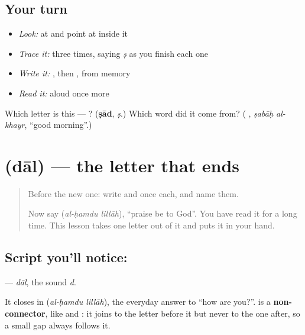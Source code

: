 \subsection*{Your turn}
\begin{itemize}
\raggedright
  \item \emph{Look:} at \textbf{ } and point at  inside it
  \item \emph{Trace it:}  three times, saying \emph{ṣ} as you finish each one
  \item \emph{Write it:} , then , from memory
  \item \emph{Read it:} \textbf{ } aloud once more
\end{itemize}

\begin{tcolorbox}[breakable,colback=teal!4,colframe=teal!35!black,title={Before you move on}]
Which letter is this — ? (\textbf{ṣād}, \emph{ṣ}.) Which word did it come from? (\textbf{ }, \emph{ṣabāḥ al-khayr}, \textquotedblleft{}good morning\textquotedblright{}.)
\end{tcolorbox}
\section[\texorpdfstring{\ar{د} (dāl)}{د (dāl)}]{ (dāl) — the letter that ends }

\label{lesson:AR-W46-dal}



\begin{quote}
Before the new one: write  and  once each, and name them.

Now say \textbf{ } (\emph{al-ḥamdu lillāh}), \textquotedblleft{}praise be to God\textquotedblright{}. You have read it for a long time. This lesson takes one letter out of it and puts it in your hand.
\end{quote}

\subsection*{Script you'll notice: }
\textbf{} — \emph{dāl}, the sound \emph{d}.

It closes \textbf{} in \textbf{ } (\emph{al-ḥamdu lillāh}), the everyday answer to \textquotedblleft{}how are you?\textquotedblright{}. \textbf{} is a \textbf{non-connector}, like \textbf{} and \textbf{}: it joins to the letter before it but never to the one after, so a small gap always follows it.


